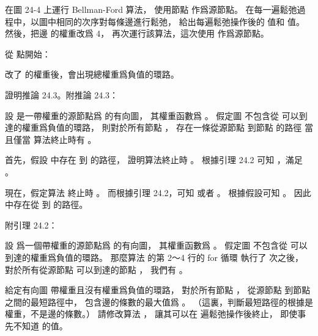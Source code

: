 \startsection[
  title={The Bellman-Ford algorithm},
  reference=section:24.1,
]

\startEXERCISE
在圖 24-4 上運行 Bellman-Ford 算法，
使用節點  作爲源節點。
在每一遍鬆弛過程中，以圖中相同的次序對每條邊進行鬆弛，
給出每遍鬆弛操作後的  值和 \m{\pi} 值。
然後，把邊  的權重改爲 4，
再次運行該算法，這次使用  作爲源節點。
\stopEXERCISE

\startANSWER
從  點開始：

\startcombination[nx=3,ny=2]
{\externalfigure[output/e24_1_1-1]}{}
{\externalfigure[output/e24_1_1-2]}{}
{\externalfigure[output/e24_1_1-3]}{}
{\externalfigure[output/e24_1_1-4]}{}
{\externalfigure[output/e24_1_1-5]}{}
\stopcombination

改了  的權重後，會出現總權重爲負值的環路。

\externalfigure[output/e24_1_1-10]
\stopANSWER

\startEXERCISE
證明推論 24.3。附推論 24.3：

設  是一帶權重的源節點爲  的有向圖，
其權重函數爲 。
假定圖  不包含從  可以到達的權重爲負值的環路，
則對於所有節點 ，
存在一條從源節點  到節點  的路徑
當且僅當  算法終止時有 。
\stopEXERCISE

\startANSWER
首先，假設  中存在  到  的路徑，
證明算法終止時  。
根據引理 24.2 可知 ，滿足 。

現在，假定算法  終止時 。
而根據引理 24.2，可知  或者 。
根據假設可知 。
因此  中存在從  到  的路徑。

附引理 24.2：

設  爲一個帶權重的源節點爲  的有向圖，
其權重函數爲 。
假定圖  不包含從  可以到達的權重爲負值的環路。
那麼算法  的第 2～4 行的 {\EMP for} 循環
執行了  次之後，
對於所有從源節點  可以到達的節點 ，
我們有 。
\stopANSWER

\startEXERCISE
給定有向圖  帶權重且沒有權重爲負值的環路，
對於所有節點 ，
從源節點  到節點  之間的最短路徑中，
包含邊的條數的最大值爲 。
（這裏，判斷最短路徑的根據是權重，不是邊的條數。）
請修改算法 ，
讓其可以在  遍鬆弛操作後終止，
即使事先不知道  的值。
\stopEXERCISE

